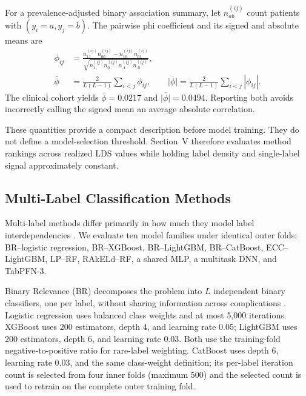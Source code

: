 \documentclass{ieeeaccess}
\begin{document}
For a prevalence-adjusted binary association summary, let $n_{ab}^{(ij)}$ count patients with $(y_i=a,y_j=b)$. The pairwise phi coefficient and its signed and absolute means are
\begin{equation}
\begin{aligned}
\phi_{ij}&=\frac{n_{11}^{(ij)}n_{00}^{(ij)}-n_{10}^{(ij)}n_{01}^{(ij)}}
{\sqrt{n_{1\cdot}^{(ij)}n_{0\cdot}^{(ij)}n_{\cdot1}^{(ij)}n_{\cdot0}^{(ij)}}},\\
\bar\phi&=\frac{2}{L(L-1)}\sum_{i<j}\phi_{ij},\qquad
\overline{|\phi|}=\frac{2}{L(L-1)}\sum_{i<j}|\phi_{ij}|.
\end{aligned}
\label{eq:phi}
\end{equation}
The clinical cohort yields $\bar\phi=0.0217$ and $\overline{|\phi|}=0.0494$. Reporting both avoids incorrectly calling the signed mean an average absolute correlation.

These quantities provide a compact description before model training. They do not define a model-selection threshold. Section~V therefore evaluates method rankings across realized $\mathrm{LDS}$ values while holding label density and single-label signal approximately constant.

\subsection{Multi-Label Classification Methods}

Multi-label methods differ primarily in how much they model label interdependencies \cite{zhang2014,gibaja2015}. We evaluate ten model families under identical outer folds: BR--logistic regression, BR--XGBoost, BR--LightGBM, BR--CatBoost, ECC--LightGBM, LP--RF, RAkELd--RF, a shared MLP, a multitask DNN, and TabPFN-3.

Binary Relevance (BR) decomposes the problem into $L$ independent binary classifiers, one per label, without sharing information across complications \cite{tsoumakas2007b}. Logistic regression uses balanced class weights and at most 5,000 iterations. XGBoost \cite{chen2016} uses 200 estimators, depth 4, and learning rate 0.05; LightGBM \cite{ke2017} uses 200 estimators, depth 6, and learning rate 0.03. Both use the training-fold negative-to-positive ratio for rare-label weighting. CatBoost \cite{prokhorenkova2018} uses depth 6, learning rate 0.03, and the same class-weight definition; its per-label iteration count is selected from four inner folds (maximum 500) and the selected count is used to retrain on the complete outer training fold.
\end{document}
